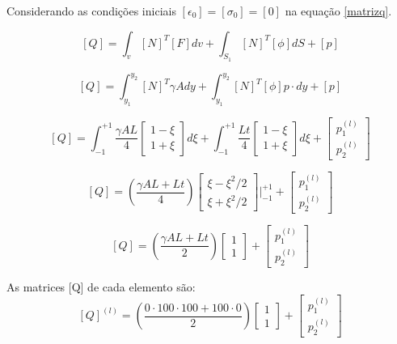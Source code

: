 \documentclass{article} %
\begin{document}
\indent Considerando as condições iniciais \([\epsilon_0]=[\sigma_0]=[0]\) na equação \ref{matrizq}.


 \begin{equation*}\label{}
[Q]=\int_v[N]^T[F]dv+\int_{S_1}[N]^T[\phi]dS+[p]
\end{equation*}

\begin{equation}\label{qmodel}
[Q]=\int_{y_1}^{y_2}[N]^T\gamma Ady+\int_{y_1}^{y_2}[N]^T[\phi]p\cdot dy+[p]
\end{equation}



\begin{equation*}\label{}
[Q]=\int_{-1}^{+1}\frac{\gamma AL}{4}\begin{bmatrix}
1-\xi\\
1+\xi
\end{bmatrix}d\xi+\int_{-1}^{+1}\frac{Lt}{4}\begin{bmatrix}
1-\xi\\
1+\xi
\end{bmatrix}d\xi+\begin{bmatrix}
p_1^{(l)}\\
p_2^{(l)}
\end{bmatrix}
\end{equation*}

\begin{equation*}\label{}
[Q]=\left(  \frac{\gamma AL+Lt}{4}  \right)
\begin{bmatrix}
\xi-\xi^2/2\\
\xi+\xi^2/2
\end{bmatrix}\biggr|_{-1}^{+1}+\begin{bmatrix}
p_1^{(l)}\\
p_2^{(l)}
\end{bmatrix}
\end{equation*}

\begin{equation}\label{}
[Q]=\left(  \frac{\gamma AL+Lt}{2}  \right)
\begin{bmatrix}
1\\
1
\end{bmatrix}+\begin{bmatrix}
p_1^{(l)}\\
p_2^{(l)}
\end{bmatrix}
\end{equation}

\indent As matrices [Q] de cada elemento são:
\begin{equation*}\label{}
[Q]^{(l)}=\left(  \frac{0\cdot 100\cdot 100 +100\cdot 0}{2}  \right)
\begin{bmatrix}
1\\
1
\end{bmatrix}+\begin{bmatrix}
p_1^{(l)}\\
p_2^{(l)}
\end{bmatrix}
\end{equation*}
\end{document}
